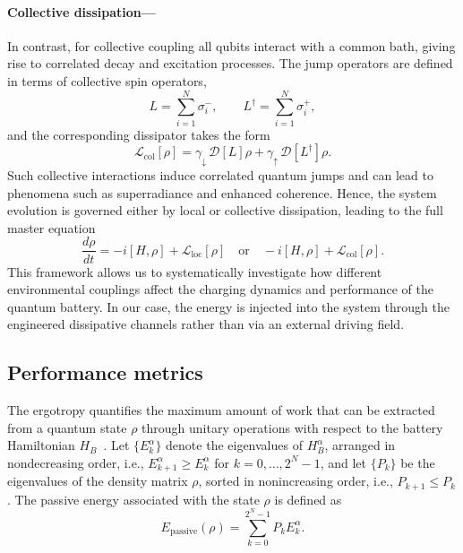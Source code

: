 \documentclass[aps,superscriptaddress,twocolumn,pre,longbibliography,floatfix]{revtex4-1}
\begin{document}
	\paragraph*{Collective dissipation---} In contrast, for collective coupling all qubits interact with a common bath, giving rise to correlated decay and excitation processes. The jump operators are defined in terms of collective spin operators,
	\begin{equation}\label{OPINT_COL}
		L = \sum_{i=1}^N \sigma_i^-,
		\qquad
		L^\dagger = \sum_{i=1}^N \sigma_i^+,
	\end{equation}
	and the corresponding dissipator takes the form
	\begin{equation}
		\mathcal{L}_{\mathrm{col}}[\rho] = \gamma_{\downarrow} \, \mathcal{D}[L]\rho +
		\gamma_{\uparrow} \, \mathcal{D}[L^\dagger]\rho.
	\end{equation}
	Such collective interactions induce correlated quantum jumps and can lead to phenomena such as superradiance and enhanced coherence. Hence, the system evolution is governed either by local or collective dissipation, leading to the full master equation
	\begin{equation}
		\frac{d\rho}{dt} = -i[H,\rho]
		+ \mathcal{L}_{\mathrm{loc}}[\rho]
		\quad \text{or} \quad
		-i[H,\rho] + \mathcal{L}_{\mathrm{col}}[\rho].
	\end{equation}
	This framework allows us to systematically investigate how different environmental couplings affect the charging dynamics and performance of the quantum battery. In our case, the energy is injected into the system through the engineered dissipative channels rather than via an external driving field.
	
	\subsection{Performance metrics}
	
	The ergotropy quantifies the maximum amount of work that can be extracted from a quantum state $\rho$ through unitary operations with respect to the battery Hamiltonian $H_B$~\cite{Allahverdyan_2004}. Let $\{E_k^{\alpha}\}$ denote the eigenvalues of $H_B^{\alpha}$, arranged in nondecreasing order, i.e., $E_{k+1}^{\alpha} \geq E_k^{\alpha}$ for $k=0,\ldots,2^N-1$, and let $\{P_k\}$ be the eigenvalues of the density matrix $\rho$, sorted in nonincreasing order, i.e., $P_{k+1} \leq P_k$. The passive energy associated with the state $\rho$ is defined as
	\begin{equation}\label{Eq.Stored_Energy_passive}
		E_{\mathrm{passive}}(\rho) = \sum_{k=0}^{2^N-1} P_k E_k^{\alpha}.
	\end{equation}
	
\end{document}
